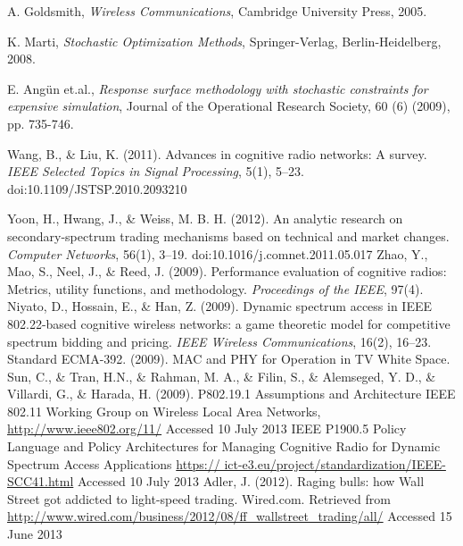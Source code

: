 \begin{thebibliography}{1}
 A. Goldsmith, \emph{Wireless Communications}, Cambridge University Press, 2005.

 K. Marti, \emph{Stochastic Optimization Methods}, Springer-Verlag, Berlin-Heidelberg, 2008.

 E. Angün et.al., \emph{Response surface methodology with stochastic constraints for expensive simulation}, Journal of the Operational Research Society, 60 (6) (2009), pp. 735-746.

 Wang, B., \& Liu, K. (2011). Advances in cognitive radio networks: A survey. \textit{IEEE Selected Topics in Signal Processing}, 5(1), 5–23. doi:10.1109/JSTSP.2010.2093210

 Yoon, H., Hwang, J., \& Weiss, M. B. H. (2012). An analytic research on secondary-spectrum trading mechanisms based on technical and market changes. \textit{Computer Networks}, 56(1), 3–19. doi:10.1016/j.comnet.2011.05.017
 Zhao, Y., Mao, S., Neel, J., \& Reed, J. (2009). Performance evaluation of cognitive radios: Metrics, utility functions, and methodology. \textit{Proceedings of the IEEE}, 97(4).
 Niyato, D., Hossain, E., \& Han, Z. (2009). Dynamic spectrum access in IEEE 802.22-based cognitive wireless networks: a game theoretic model for competitive spectrum bidding and pricing. \textit{IEEE Wireless Communications}, 16(2), 16–23.
 Standard ECMA-392. (2009). MAC and PHY for Operation in TV White Space.
 Sun, C., \& Tran, H.N., \& Rahman, M. A., \& Filin, S., \& Alemseged, Y. D., \& Villardi, G., \& Harada, H. (2009). P802.19.1 Assumptions and Architecture
 IEEE 802.11 Working Group on Wireless Local Area Networks, \url{http://www.ieee802.org/11/} Accessed 10 July 2013
 IEEE P1900.5 Policy Language and Policy Architectures for Managing Cognitive Radio for Dynamic Spectrum Access Applications \url{https:// ict-e3.eu/project/standardization/IEEE-SCC41.html} Accessed 10 July 2013
 Adler, J. (2012). Raging bulls: how Wall Street got addicted to light-speed trading. Wired.com. Retrieved from \url{http://www.wired.com/business/2012/08/ff_wallstreet_trading/all/} Accessed 15 June 2013


\end{thebibliography}
